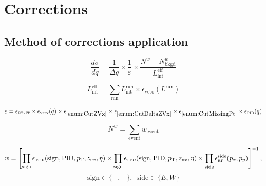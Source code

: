 

\chapter{Corrections}\label{chap:corrections}

\section{Method of corrections application}\label{sec:correctionProcedure}
\begin{equation}
  \frac{d\sigma}{dq} = \frac{1}{\Delta q} \times \frac{1}{\varepsilon} \times \frac{N^{\mathit{w}}-N^{\mathit{w}}_\textrm{bkgd}}{\mathit{L}_{\textrm{int}}^{\textrm{eff}}}
\end{equation}

\begin{equation}\label{eq:effectiveLumi}
	\mathit{L}_{\textrm{int}}^{\textrm{eff}} = \sum\limits_{\textrm{run}}\mathit{L}_{\textrm{int}}^{\textrm{run}} \times \epsilon_{\textrm{veto}}(L^{\textrm{run}})
\end{equation}

\begin{equation}
	\varepsilon = \epsilon_{\textrm{\tiny ET/IT}} \times \epsilon_{\textrm{vrtx}}(q) \times \epsilon_{\ref{enum:CutZVx}} \times \epsilon_{\ref{enum:CutDeltaZVx}} \times \epsilon_{\ref{enum:CutMissingPt}} \times \epsilon_{\textrm{\tiny PID}}(q)
\end{equation}

\begin{equation}
	N^{\mathit{w}} = \sum\limits_{\textrm{event}}\mathit{w}_{\textrm{event}}
\end{equation}



\begin{equation}
	\mathit{w} = \left[\prod\limits_{\textrm{sign}} \epsilon_{\textrm{\tiny TOF}}(\textrm{sign}, \textrm{PID}, p_{\text{T}},z_{vx},\eta)  \times \prod\limits_{\textrm{sign}} \epsilon_{\textrm{\tiny TPC}}(\textrm{sign}, \textrm{PID}, p_{\text{T}},z_{vx},\eta) \times \prod\limits_{\textrm{side}}\epsilon_{\textrm{\tiny RP}}^{\textrm{side}}(p_{x},p_{y}) \right]^{-1},
\end{equation}
\[\textrm{sign}\in\{+,-\},~~\textrm{side}\in\{E,W\}\]





